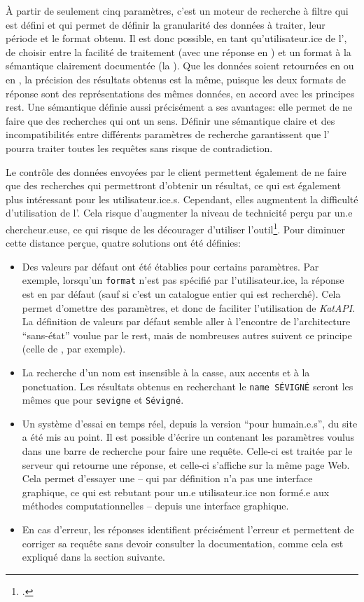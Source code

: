 À partir de seulement cinq paramètres, c'est un moteur de recherche à filtre qui est défini et qui permet de définir la granularité des données à traiter, leur période et le format obtenu. Il est donc possible, en tant qu'utilisateur.ice de l'\api{}, de choisir entre la facilité de traitement (avec une réponse en \json{}) et un format à la sémantique clairement documentée (la \tei{}). Que les données soient retournées en \tei{} ou en \json{}, la précision des résultats obtenus est la même, puisque les deux formats de réponse sont des représentations des mêmes données, en accord avec les principes \gls{rest}. Une sémantique définie aussi précisément a ses avantages: elle permet de ne faire que des recherches qui ont un sens. Définir une sémantique claire et des incompatibilités entre différents paramètres de recherche garantissent que l'\api{} pourra traiter toutes les requêtes sans risque de contradiction.

 Le contrôle des données envoyées par le client permettent également de ne faire que des recherches qui permettront d'obtenir un résultat, ce qui est également plus intéressant pour les utilisateur.ice.s. Cependant, elles augmentent la difficulté d'utilisation de l'\api{}. Cela risque d'augmenter la niveau de technicité perçu par un.e chercheur.euse, ce qui risque de les décourager d'utiliser l'outil\footcite[p. 292-294]{edmond_apis_2015}. Pour diminuer cette distance perçue, quatre solutions ont été définies:
\begin{itemize}
	\item Des valeurs par défaut ont été établies pour certains paramètres. Par exemple, lorsqu'un \texttt{format} n'est pas spécifié par l'utilisateur.ice, la réponse est en \json{} par défaut (sauf si c'est un catalogue entier qui est recherché). Cela permet d'omettre des paramètres, et donc de faciliter l'utilisation de \textit{KatAPI}. La définition de valeurs par défaut semble aller à l'encontre de l'architecture \enquote{sans-état} voulue par le \gls{rest}, mais de nombreuses autres \api{} suivent ce principe (celle de \wkd{}, par exemple).
	\item La recherche d'un nom est insensible à la casse, aux accents et à la ponctuation. Les résultats obtenus en recherchant le \texttt{name SÉVIGNÉ} seront les mêmes que pour \texttt{sevigne} et \texttt{Sévigné}.
	\item Un système d'essai en temps réel, depuis la version \enquote{pour humain.e.s}, du site a été mis au point. Il est possible d'écrire un \json{} contenant les paramètres voulus dans une barre de recherche pour faire une requête. Celle-ci est traitée par le serveur qui retourne une réponse, et celle-ci s'affiche sur la même page Web. Cela permet d'essayer une \api{} -- qui par définition n'a pas une interface graphique, ce qui est rebutant pour un.e utilisateur.ice non formé.e aux méthodes computationnelles -- depuis une interface graphique.
	\item En cas d'erreur, les réponses identifient précisément l'erreur et permettent de corriger sa requête sans devoir consulter la documentation, comme cela est expliqué dans la section suivante.
\end{itemize}

